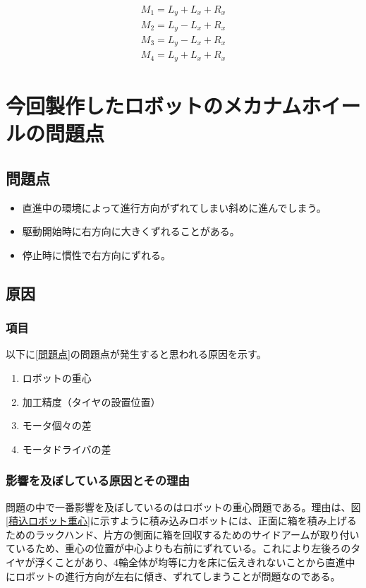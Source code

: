 \documentclass[12pt,oneside]{sotsuken_paper}
\begin{document}
		\begin{eqnarray}
		M_1 = L_y + L_x + R_x
		\label{式1}
		\\
		M_2 = L_y - L_x + R_x
		\label{式2}
		\\
		M_3 = L_y - L_x + R_x
		\label{式3}
		\\
		M_4 = L_y + L_x + R_x
		\label{式4}
		\end{eqnarray}

\chapter{今回製作したロボットのメカナムホイールの問題点}

	\section{問題点}

	\begin{itemize}
		\item 直進中の環境によって進行方向がずれてしまい斜めに進んでしまう。
		\item 駆動開始時に右方向に大きくずれることがある。
		\item 停止時に慣性で右方向にずれる。
	\end{itemize}
	\label{問題点}

	\section{原因}

		\subsection{項目}
		以下に\ref{問題点}の問題点が発生すると思われる原因を示す。

		\begin{enumerate}
			\item ロボットの重心
			\item 加工精度（タイヤの設置位置）
			\item モータ個々の差
			\item モータドライバの差
		\end{enumerate}

		\subsection{影響を及ぼしている原因とその理由}
		問題の中で一番影響を及ぼしているのはロボットの重心問題である。理由は、図\ref{積込ロボット重心}に示すように積み込みロボットには、正面に箱を積み上げるためのラックハンド、片方の側面に箱を回収するためのサイドアームが取り付いているため、重心の位置が中心よりも右前にずれている。これにより左後ろのタイヤが浮くことがあり、4輪全体が均等に力を床に伝えきれないことから直進中にロボットの進行方向が左右に傾き、ずれてしまうことが問題なのである。
\end{document}
